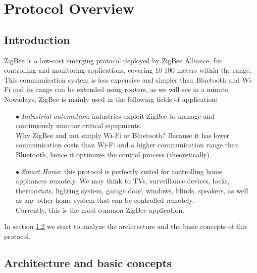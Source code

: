 \documentclass[12pt]{report}
\begin{document}
{{\chapter{Protocol Overview}

\section{Introduction}
\bigskip

ZigBee is a low-cost emerging protocol deployed by ZigBee Alliance, for controlling and monitoring applications, covering 10-100 meters within the range. \\
This communication system is less expensive and simpler than Bluetooth and Wi-Fi and its range can be extended using routers, as we will see in a minute.\\

Nowadays, ZigBee is mainly used in the following fields of application:
\begin{itemize}
\setlength{\itemindent}{+4mm}
\item[$\bullet$] \emph{Industrial automation}: industries exploit ZigBee to manage and continuously monitor critical equipments.\\
Why ZigBee and not simply Wi-Fi or Bluetooth? Because it has lower communication costs than Wi-Fi and a higher communication range than Bluetooth, hence it optimizes the control process (theoretically).
\item[$\bullet$] \emph{Smart Home}: this protocol is perfectly suited for controlling home appliances remotely. We may think to TVs, surveillance devices, locks, thermostats, lighting system, garage door, windows, blinds, speakers, as well as any other home system that can be controlled remotely.\\
Currently, this is the most common ZigBee application.\\

\end{itemize}

In section \ref{sec:zigbeearch} we start to analyze the architecture and the basic concepts of this protocol.\\

\section{Architecture and basic concepts}
\label{sec:zigbeearch}
\bigskip

}}
\end{document}
